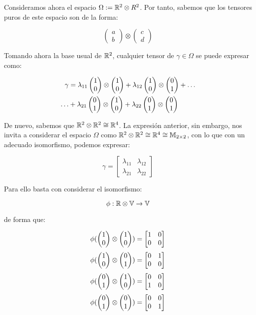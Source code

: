 \begin{ejemplo} \label{ejemplo:R2xR2}
    Consideramos ahora el espacio $\Omega := \mathbb{R}^2 \otimes R^2$. Por tanto, sabemos que los tensores puros de este espacio son de la forma:

    $$\begin{pmatrix} a \\ b \end{pmatrix} \otimes \begin{pmatrix} c \\ d \end{pmatrix}$$

    Tomando ahora la base usual de $\mathbb{R}^2$, cualquier tensor de $\gamma \in \Omega$ se puede expresar como:

    \begin{equation}
    \begin{split}
        \gamma &= \lambda_{11} \begin{pmatrix} 1 \\ 0 \end{pmatrix} \otimes \begin{pmatrix} 1 \\ 0 \end{pmatrix} + \lambda_{12} \begin{pmatrix} 1 \\ 0 \end{pmatrix} \otimes \begin{pmatrix} 0 \\ 1 \end{pmatrix} + \ldots \\
        \ldots &+ \lambda_{21} \begin{pmatrix} 0 \\ 1 \end{pmatrix} \otimes \begin{pmatrix} 1 \\ 0 \end{pmatrix} + \lambda_{22} \begin{pmatrix} 0 \\ 1 \end{pmatrix} \otimes \begin{pmatrix} 0 \\ 1 \end{pmatrix}
    \end{split}
    \end{equation}

    De nuevo, sabemos que $\mathbb{R}^2 \otimes \mathbb{R}^2 \cong \mathbb{R}^4$. La expresión anterior, sin embargo, nos invita a considerar el espacio $\Omega$ como $\mathbb{R}^2 \otimes \mathbb{R}^2 \cong \mathbb{R}^4 \cong \mathbb{M}_{2 \times 2}$, con lo que con un adecuado isomorfismo, podemos expresar:

    $$\gamma = \begin{bmatrix}
        \lambda_{11} & \lambda_{12} \\
        \lambda_{21} & \lambda_{22}
    \end{bmatrix}$$

    Para ello basta con considerar el isomorfismo:

    \begin{equation}
        \phi: \mathbb{R} \otimes \mathbb{V} \to \mathbb{V}
    \end{equation}

    de forma que:

    $$\phi(\begin{pmatrix} 1 \\ 0 \end{pmatrix} \otimes \begin{pmatrix} 1 \\ 0 \end{pmatrix}) = \begin{bmatrix} 1 & 0 \\ 0 & 0 \end{bmatrix}$$
    $$\phi(\begin{pmatrix} 1 \\ 0 \end{pmatrix} \otimes \begin{pmatrix} 0 \\ 1 \end{pmatrix}) = \begin{bmatrix} 0 & 1 \\ 0 & 0 \end{bmatrix}$$
    $$\phi(\begin{pmatrix} 0 \\ 1 \end{pmatrix} \otimes \begin{pmatrix} 1 \\ 0 \end{pmatrix}) = \begin{bmatrix} 0 & 0 \\ 1 & 0 \end{bmatrix}$$
    $$\phi(\begin{pmatrix} 0 \\ 1 \end{pmatrix} \otimes \begin{pmatrix} 0 \\ 1 \end{pmatrix}) = \begin{bmatrix} 0 & 0 \\ 0 & 1 \end{bmatrix}$$


\end{ejemplo}
